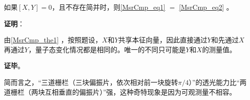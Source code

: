 \begin{theorem}{}
如果$[X, Y]=0$，且不存在简并时，则\autoref{MsrCmp_eq1} $=$ \autoref{MsrCmp_eq2} 。
\end{theorem}

\textbf{证明}：

由\autoref{MsrCmp_the1} ，按照题设，$X$和$Y$共享本征向量，因此直接通过$Y$和先通过$X$再通过$Y$，量子态变化情况都是相同的。唯一的不同只可能是$Y$和$X$的测量值。

\textbf{证毕}。

简而言之，“三道栅栏（三块偏振片，依次相对前一块旋转$\pi/4$）”的透光能力比“两道栅栏（两块互相垂直的偏振片）”强，这种奇特现象是因为可观测量不相容。

























